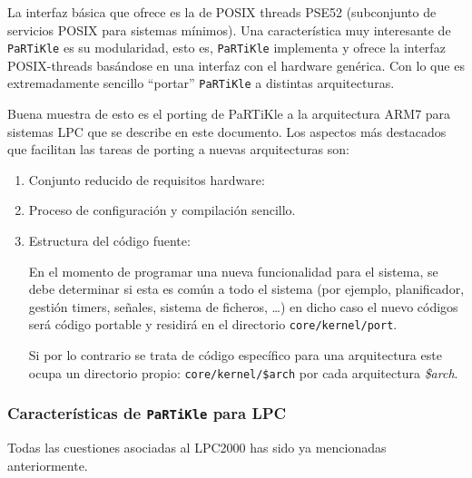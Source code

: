 \documentclass[10pt,a4paper]{article}
\newcommand{\partikle}[0]{\texttt{PaRTiKle}}
\newenvironment{itemize*}
        {\begin{itemize}%
                \setlength{\parskip}{2pt}%
                \setlength{\itemsep}{0pt}}
        {\end{itemize}}
\begin{document}
	La interfaz básica que ofrece es la de POSIX threads PSE52 (subconjunto de servicios POSIX para sistemas mínimos).  Una característica muy interesante de \partikle{} es su modularidad, esto es, \partikle{} implementa y ofrece la interfaz POSIX-threads basándose en una interfaz con el hardware genérica. Con lo que es extremadamente sencillo ``portar'' \partikle{} a distintas arquitecturas.
	
	Buena muestra de esto es el porting de PaRTiKle a la arquitectura ARM7 para sistemas LPC que se describe en este documento. Los aspectos más destacados que facilitan las tareas de porting a nuevas arquitecturas son:
	
	\begin{enumerate}
	\item Conjunto reducido de requisitos hardware: 
		

	\item Proceso de configuración y compilación sencillo.

	\item Estructura del código fuente: 
	
	En el momento de programar una nueva funcionalidad para el sistema, se debe determinar si esta es común a todo el sistema (por ejemplo, planificador, gestión timers, señales, sistema de ficheros, \ldots) en dicho caso el nuevo códigos será código portable y residirá en el directorio \texttt{core/kernel/port}.
	
	Si por lo contrario se trata de código específico para una arquitectura este ocupa un directorio propio: \texttt{core/kernel/\$arch} por cada arquitectura \emph{\$arch}.
	\end{enumerate}
	
	\subsubsection{Características de \partikle{} para LPC}

	Todas las cuestiones asociadas al LPC2000 has sido ya mencionadas anteriormente.
\end{document}
